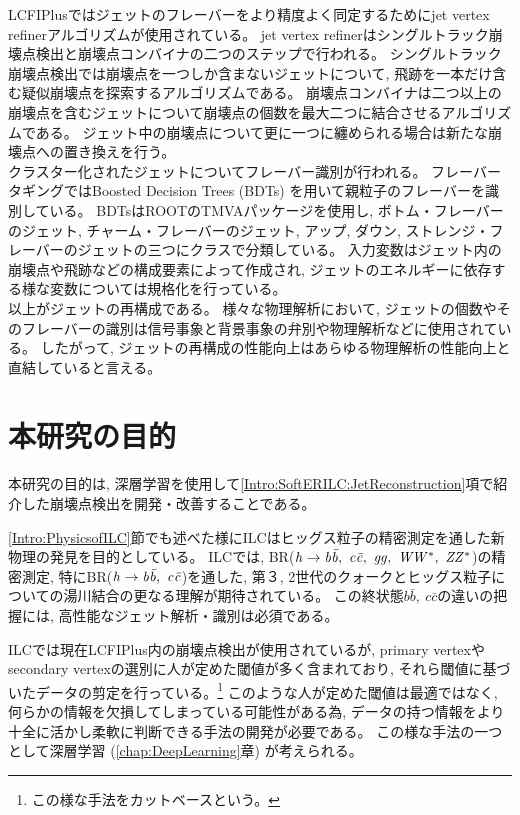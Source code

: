 LCFIPlusではジェットのフレーバーをより精度よく同定するためにjet vertex refinerアルゴリズムが使用されている。
jet vertex refinerはシングルトラック崩壊点検出と崩壊点コンバイナの二つのステップで行われる。
シングルトラック崩壊点検出では崩壊点を一つしか含まないジェットについて, 飛跡を一本だけ含む疑似崩壊点を探索するアルゴリズムである。
崩壊点コンバイナは二つ以上の崩壊点を含むジェットについて崩壊点の個数を最大二つに結合させるアルゴリズムである。
ジェット中の崩壊点について更に一つに纏められる場合は新たな崩壊点への置き換えを行う。\\

クラスター化されたジェットについてフレーバー識別が行われる。
フレーバータギングではBoosted Decision Trees (BDTs) を用いて親粒子のフレーバーを識別している。
BDTsはROOTのTMVAパッケージを使用し, ボトム・フレーバーのジェット, チャーム・フレーバーのジェット, アップ, ダウン, ストレンジ・フレーバーのジェットの三つにクラスで分類している。
入力変数はジェット内の崩壊点や飛跡などの構成要素によって作成され, ジェットのエネルギーに依存する様な変数については規格化を行っている。\\

以上がジェットの再構成である。
様々な物理解析において, ジェットの個数やそのフレーバーの識別は信号事象と背景事象の弁別や物理解析などに使用されている。
したがって, ジェットの再構成の性能向上はあらゆる物理解析の性能向上と直結していると言える。

\newpage
\section{本研究の目的} \label{Intro:Purpose}

本研究の目的は, 深層学習を使用して\ref{Intro:SoftERILC:JetReconstruction}項で紹介した崩壊点検出を開発・改善することである。

\ref{Intro:PhysicsofILC}節でも述べた様にILCはヒッグス粒子の精密測定を通した新物理の発見を目的としている。
ILCでは, BR($\it h \to b \bar{b},\ c \bar{c},\ gg,\ WW^*,\ ZZ^*$)の精密測定, 特にBR($\it h \to b \bar{b},\ c \bar{c}$)を通した, 第３, 2世代のクォークとヒッグス粒子についての湯川結合の更なる理解が期待されている。
この終状態$b \bar{b},\ c \bar{c}$の違いの把握には, 高性能なジェット解析・識別は必須である。

ILCでは現在LCFIPlus内の崩壊点検出が使用されているが, primary vertexやsecondary vertexの選別に人が定めた閾値が多く含まれており, それら閾値に基づいたデータの剪定を行っている。\footnote{この様な手法をカットベースという。}
このような人が定めた閾値は最適ではなく, 何らかの情報を欠損してしまっている可能性がある為, データの持つ情報をより十全に活かし柔軟に判断できる手法の開発が必要である。
この様な手法の一つとして深層学習 (\ref{chap:DeepLearning}章) が考えられる。


